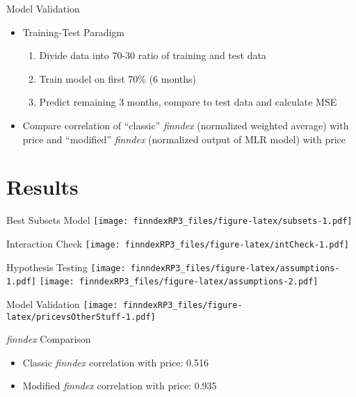\documentclass[10pt]{beamer}
\begin{document}
    \begin{frame}[fragile]{Model Validation}
        \begin{itemize}
            \item Training-Test Paradigm
        \begin{enumerate}
            \item Divide data into 70-30 ratio of training and test data 
            \item Train model on first 70\% (6 months)
            \item Predict remaining 3 months, compare to test data and calculate MSE
        \end{enumerate}
        \item Compare correlation of ``classic'' \textit{finndex} (normalized weighted average) with price and ``modified'' \textit{finndex} (normalized output of MLR model) with price
        \end{itemize}
    \end{frame}
    \section{Results}
    \begin{frame}[fragile]{Best Subsets Model}
        \texttt{[image: finndexRP3\_files/figure-latex/subsets-1.pdf]} \mbox{}
    \end{frame}
    \begin{frame}[fragile]{Interaction Check}
        \texttt{[image: finndexRP3\_files/figure-latex/intCheck-1.pdf]} \mbox{}
    \end{frame}
    \begin{frame}[fragile]{Hypothesis Testing}
        \texttt{[image: finndexRP3\_files/figure-latex/assumptions-1.pdf]}%
        \texttt{[image: finndexRP3\_files/figure-latex/assumptions-2.pdf]} 
    \end{frame}
    \begin{frame}[fragile]{Model Validation}
        \texttt{[image: finndexRP3\_files/figure-latex/pricevsOtherStuff-1.pdf]}
    \end{frame}
    \begin{frame}[fragile]{\textit{finndex} Comparison}
        \begin{itemize}
            \item Classic \textit{finndex} correlation with price: 0.516
            \item Modified \textit{finndex} correlation with price: 0.935
        \end{itemize}
    \end{frame}
\end{document}
